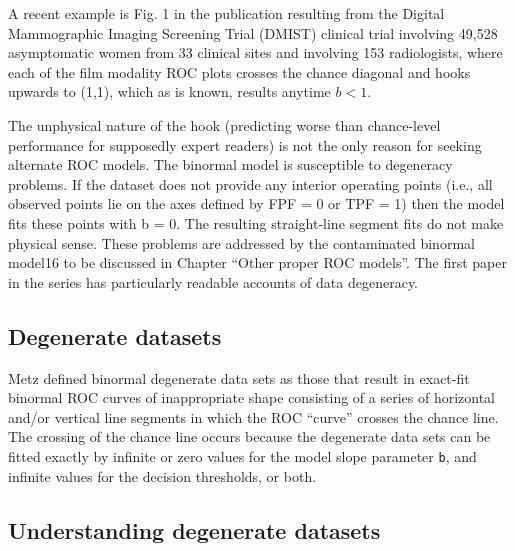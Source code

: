 \documentclass[
]{book}
\begin{document}
A recent example is Fig. 1 in the publication resulting from the Digital Mammographic Imaging Screening Trial (DMIST) clinical trial \citep{RN1784} involving 49,528 asymptomatic women from 33 clinical sites and involving 153 radiologists, where each of the film modality ROC plots crosses the chance diagonal and hooks upwards to (1,1), which as is known, results anytime \(b <1\).

The unphysical nature of the hook (predicting worse than chance-level performance for supposedly expert readers) is not the only reason for seeking alternate ROC models. The binormal model is susceptible to degeneracy problems. If the dataset does not provide any interior operating points (i.e., all observed points lie on the axes defined by FPF = 0 or TPF = 1) then the model fits these points with b = 0. The resulting straight-line segment fits do not make physical sense. These problems are addressed by the contaminated binormal model16 to be discussed in Chapter ``Other proper ROC models''. The first paper in the series has particularly readable accounts of data degeneracy.

\hypertarget{degenerate-datasets}{%
\subsection{Degenerate datasets}\label{degenerate-datasets}}

Metz defined binormal degenerate data sets as those that result in exact-fit binormal ROC curves of inappropriate shape consisting of a series of horizontal and/or vertical line segments in which the ROC ``curve'' crosses the chance line. The crossing of the chance line occurs because the degenerate data sets can be fitted exactly by infinite or zero values for the model slope parameter \texttt{b}, and infinite values for the decision thresholds, or both.

\hypertarget{understanding-degenerate-datasets}{%
\subsection{Understanding degenerate datasets}\label{understanding-degenerate-datasets}}
\end{document}
